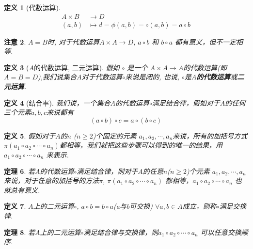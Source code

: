\documentclass[UTF8]{ctexart}
\newtheorem{Definition}{定义}%
\newtheorem{Theorem}[Definition]{定理}
\newtheorem{Remark}[Definition]{注意}
\begin{document}
\begin{Definition}[代数运算] 
$$\begin{aligned}
A \times B &\rightarrow D \\ 
(a, b) &\mapsto d = \phi(a, b) = \circ (a, b) = a \circ b \end{aligned}$$
\end{Definition}

\begin{Remark}
 $A = B$时, 对于代数运算$ A \times A \rightarrow D $, $ a \circ b $ 和 $ b \circ a $ 都有意义，但不一定相等.
\end{Remark}

\begin{Definition}[$A$的代数运算, 二元运算] 
假如 $ \circ $ 是一个 $ A \times A \rightarrow A$的代数运算(即$A = B = D$),我们说集合$A$对于代数运算$\circ$来说是闭的, 也说, $\circ$是\textbf{$A$的代数运算}或\textbf{二元运算}.
\end{Definition}

\begin{Definition}[结合率]
我们说，一个集合$A$的代数运算$\circ$满足结合律，假如对于$A$的任何三个元素$a, b, c$来说都有$$
(a \circ b) \circ c = a \circ (b \circ c)
$$
\end{Definition}

\begin{Definition}
假如对于$A$的$n$ ($n \ge 2$)个固定的元素 $a_1, a_2, \cdots, a_n$来说，所有的加括号方式 $\pi(a_1 \circ a_2 \circ \cdots \circ a_n)$都相等，我们就把这些步骤可以得到的唯一的结果，用$a_1 \circ a_2 \circ \cdots \circ a_n $ 来表示.
\end{Definition}

\begin{Theorem}
若$A$的代数运算$\circ$满足结合律，则对于$A$的任意$n$($n \ge 2$)个元素 $a_1, a_2, \cdots, a_n$来说，对于任意的加括号的方法$\pi$, $\pi(a_1 \circ a_2 \circ \cdots \circ a_n)$ 都相等，$a_1 \circ a_2 \circ \cdots \circ a_n$ 也就总有意义.
\end{Theorem}

\begin{Definition}
$A$上的二元运算$\circ$, $a \circ b = b \circ a$\;(a与b可交换) $\forall a, b \in A$成立，则称$\circ$满足交换律. 
\end{Definition}

\begin{Theorem}
若$A$上的二元运算$\circ$满足结合律与交换律，则$a_1 \circ a_2 \circ \cdots \circ a_n$ 可以任意交换顺序.
\end{Theorem}
\end{document}
